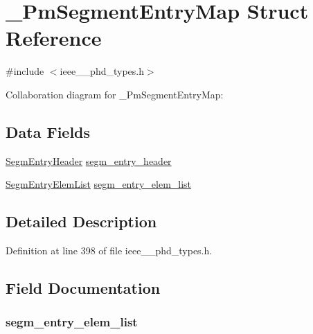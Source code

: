 \hypertarget{struct___pm_segment_entry_map}{}\section{\+\_\+\+Pm\+Segment\+Entry\+Map Struct Reference}
\label{struct___pm_segment_entry_map}


{\ttfamily \#include $<$ieee\+\_\+\_\+phd\+\_\+types.\+h$>$}



Collaboration diagram for \+\_\+\+Pm\+Segment\+Entry\+Map\+:
\subsection*{Data Fields}
\begin{DoxyCompactItemize}
\item 
\hyperlink{ieee__11073__phd__types_8h_ae2dfa02f660d4bfe83f085cab8658e6a}{Segm\+Entry\+Header} \hyperlink{struct___pm_segment_entry_map_a8d43bfa723d4b36629caef6642bbeb56}{segm\+\_\+entry\+\_\+header}
\item 
\hyperlink{ieee__11073__phd__types_8h_a27b3609735ded4203181d12127f2a727}{Segm\+Entry\+Elem\+List} \hyperlink{struct___pm_segment_entry_map_ab89a9e566d2791f138ec3f411acc9608}{segm\+\_\+entry\+\_\+elem\+\_\+list}
\end{DoxyCompactItemize}


\subsection{Detailed Description}


Definition at line 398 of file ieee\+\_\+\_\+phd\+\_\+types.\+h.



\subsection{Field Documentation}
\hypertarget{struct___pm_segment_entry_map_ab89a9e566d2791f138ec3f411acc9608}{}
\subsubsection[{segm\+\_\+entry\+\_\+elem\+\_\+list}]{ segm\+\_\+entry\+\_\+elem\+\_\+list}\label{struct___pm_segment_entry_map_ab89a9e566d2791f138ec3f411acc9608}


